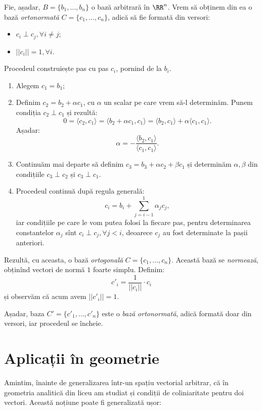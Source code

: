 Fie, așadar, $ B = \{ b_1, \dots, b_n \} $ o bază arbitrară în $ \RR^n $.
Vrem să obținem din ea o bază \emph{ortonormată} $ C = \{ c_1, \dots, c_n \} $,
adică să fie formată din versori:
\begin{itemize}
\item $ c_i \perp c_j, \forall i \neq j $;
\item $ || c_i || = 1, \forall i $.
\end{itemize}

Procedeul construiește pas cu pas $ c_i $, pornind de la $ b_i $.
\begin{enumerate}[(1)]
\item Alegem $ c_1 = b_1 $;
\item Definim $ c_2 = b_2 + \alpha c_1 $, cu $ \alpha $ un scalar pe care vrem
  să-l determinăm. Punem condiția $ c_2 \perp c_1 $ și rezultă:
  \[
    0 = \langle c_2, c_1 \rangle = \langle b_2 + \alpha c_1, c_1 \rangle = %
    \langle b_2, c_1 \rangle + \alpha \langle c_1, c_1 \rangle.
  \]
  Așadar:
  \[
    \alpha = - \frac{\langle b_2, c_1 \rangle}{\langle c_1, c_1 \rangle}.
  \]
\item Continuăm mai departe să definim $ c_3 = b_3 + \alpha c_2 + \beta c_1 $
  și determinăm $ \alpha, \beta $ din condițiile $ c_3 \perp c_2 $ și $ c_3 \perp c_1 $.
\item Procedeul continuă după regula generală:
  \[
    c_i = b_i + \sum_{j = i - 1}^1 \alpha_j c_j,
  \]
  iar condițiile pe care le vom putea folosi la fiecare pas, pentru determinarea
  constantelor $ \alpha_j $ sînt $ c_i \perp c_j, \forall j < i $, deoarece $ c_j $
  au fost determinate la pașii anteriori.
\end{enumerate}

Rezultă, cu aceasta, o bază \emph{ortogonală} $ C = \{ c_1, \dots, c_n \} $.
Această bază se \emph{normează}, obținînd vectori de normă $ 1 $ foarte simplu.
Definim:
\[
  c'_i = \frac{1}{||c_i||} \cdot c_i
\]
și observăm că acum avem $ ||c'_i|| = 1 $.

Așadar, baza $ C' = \{ c'_1, \dots, c'_n \} $ este o \emph{bază ortonormată},
adică formată doar din versori, iar procedeul se încheie.

\section{Aplicații în geometrie}

Amintim, înainte de generalizarea într-un spațiu vectorial arbitrar, că
în geometria analitică din liceu am studiat și condiții de coliniaritate
pentru doi vectori. Această noțiune poate fi generalizată ușor:

